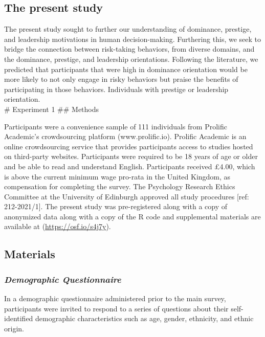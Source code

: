 \documentclass[
  donotrepeattitle,doc, 12pt, a4paper,floatsintext]{apa7}
\begin{document}
\hypertarget{the-present-study}{%
\subsection{The present study}\label{the-present-study}}

The present study sought to further our understanding of dominance, prestige, and leadership motivations in human decision-making. Furthering this, we seek to bridge the connection between risk-taking behaviors, from diverse domains, and the dominance, prestige, and leadership orientations. Following the literature, we predicted that participants that were high in dominance orientation would be more likely to not only engage in risky behaviors but praise the benefits of participating in those behaviors. Individuals with prestige or leadership orientation.\\
\# Experiment 1
\#\# Methods

Participants were a convenience sample of 111 individuals from Prolific Academic's crowdsourcing platform (www.prolific.io). Prolific Academic is an online crowdsourcing service that provides participants access to studies hosted on third-party websites. Participants were required to be 18 years of age or older and be able to read and understand English. Participants received £4.00, which is above the current minimum wage pro-rata in the United Kingdom, as compensation for completing the survey. The Psychology Research Ethics Committee at the University of Edinburgh approved all study procedures {[}ref: 212-2021/1{]}. The present study was pre-registered along with a copy of anonymized data along with a copy of the R code and supplemental materials are available at (\url{https://osf.io/s4j7y}).

\hypertarget{materials-1}{%
\subsection{Materials}\label{materials-1}}

\hypertarget{demographic-questionnaire-1}{%
\subsubsection{\texorpdfstring{\emph{Demographic Questionnaire}}{Demographic Questionnaire}}\label{demographic-questionnaire-1}}

In a demographic questionnaire administered prior to the main survey, participants were invited to respond to a series of questions about their self-identified demographic characteristics such as age, gender, ethnicity, and ethnic origin.
\end{document}
